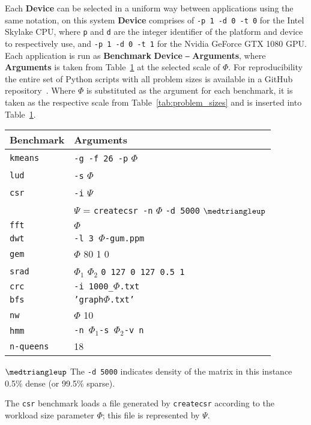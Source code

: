 \documentclass[../document.tex]{subfiles}
\begin{document}
Each {\bf Device} can be selected in a uniform way between applications using the same notation, on this system {\bf Device} comprises of {\tt -p 1 -d 0 -t 0} for the Intel Skylake CPU, where {\tt p} and {\tt d} are the integer identifier of the platform and device to respectively use, and {\tt -p 1 -d 0 -t 1} for the Nvidia GeForce GTX 1080 GPU.
Each application is run as {\bf Benchmark} {\bf Device} {\tt --} {\bf Arguments}, where {\bf Arguments} is taken from Table~\ref{tab:program_arguments} at the selected scale of $\Phi$.
For reproducibility the entire set of Python scripts with all problem sizes is available in a GitHub repository~\cite{johnston2017}. 
Where $\Phi$ is substituted as the argument for each benchmark, it is taken as the respective scale from Table~\ref{tab:problem_sizes} and is inserted into Table~\ref{tab:program_arguments}.

\begin{table}[t]
	\centering
	\begin{threeparttable}
		\centering
		\vspace{0pt}
		\begin{tabular}{l|l}
			\bf Benchmark & \bf Arguments\\\hline
			{\tt kmeans} & {\tt -g -f 26 -p} $\Phi$\\
			{\tt lud} & {\tt -s} $\Phi$\\
			{\tt csr}\textdagger & {\tt -i} $\Psi$\\
			      & $\Psi$ = {\tt createcsr -n} $\Phi$ {\tt -d 5000} $\medtriangleup$\\
			{\tt fft} & $\Phi$ \\
			{\tt dwt} & {\tt -l 3 }$\Phi${\tt-gum.ppm}\\
			{\tt gem} & $\Phi$ {80 1 0}\\
			{\tt srad}& $\Phi_1$ $\Phi_2$ {\tt 0 127 0 127 0.5 1}\\
			{\tt crc}&  {\tt -i 1000\_}$\Phi${\tt.txt}\\
            {\tt bfs}&  {\tt 'graph}$\Phi${\tt.txt'}\\
            {\tt nw}&  $\Phi${ 10}\\
            {\tt hmm}&  {\tt -n }$\Phi_1${\tt -s }$\Phi_2${\tt -v n}\\
            {\tt n-queens} & 18\\
		\end{tabular}
		\begin{tablenotes}
			\item [$\medtriangleup$] The {\tt -d 5000} indicates density of the matrix in this instance 0.5\% dense (or 99.5\% sparse).
			\item [\textdagger] The {\tt csr} benchmark loads a file generated by {\tt createcsr} according to the workload size parameter $\Phi$; this file is represented by $\Psi$.
		\end{tablenotes}
		\label{tab:program_arguments}
	\end{threeparttable}
\end{table}
\end{document}

